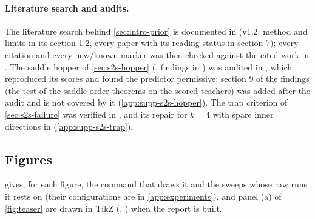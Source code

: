 \paragraph{Literature search and audits.}
The literature search behind \cref{sec:intro-prior} is documented in  (v1.2; method and
limits in its section 1.2, every paper with its reading status in section 7); every citation and every new/known
marker was then checked against the cited work in . The saddle
hopper of \cref{sec:s2s-hopper} (, findings in ) was
audited in , which reproduced its scores and found the predictor
permissive; section 9 of the findings (the test of the saddle-order theorems on the scored teachers) was added
after the audit and is not covered by it (\cref{app:supp-s2s-hopper}). The trap criterion of
\cref{sec:s2s-failure} was verified in , and its repair for $k=4$ with
spare inner directions in  (\cref{app:supp-s2s-trap}).

\subsection{Figures}\label{app:repro-figures}
 gives, for each figure, the command that draws it and the sweeps whose raw
runs it rests on (their configurations are in \cref{app:experiments}).  and panel (a) of
\cref{fig:teaser} are drawn in TikZ (, ) when the report
is built.

